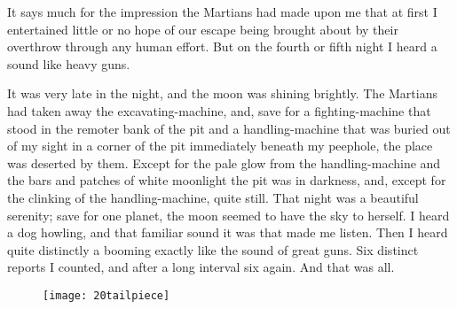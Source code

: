 It says much for the impression the Martians had made upon me that at first I entertained little or no hope of our escape being brought about by their overthrow through any human effort. But on the fourth or fifth night I heard a sound like heavy guns.

It was very late in the night, and the moon was shining brightly. The Martians had taken away the excavating-machine, and, save for a fighting-machine that stood in the remoter bank of the pit and a handling-machine that was buried out of my sight in a corner of the pit immediately beneath my peephole, the place was deserted by them. Except for the pale glow from the handling-machine and the bars and patches of white moonlight the pit was in darkness, and, except for the clinking of the handling-machine, quite still. That night was a beautiful serenity; save for one planet, the moon seemed to have the sky to herself. I heard a dog howling, and that familiar sound it was that made me listen. Then I heard quite distinctly a booming exactly like the sound of great guns. Six distinct reports I counted, and after a long interval six again. And that was all.

\begin{figure}[b!]
\centering
\texttt{[image: 20tailpiece]}
\end{figure}